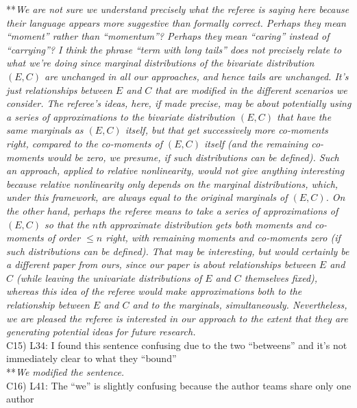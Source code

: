 \documentclass[letterpaper,11pt]{article}
\begin{document}
\noindent ***\emph{We are not sure we understand precisely what the referee is saying here because their language
appears more suggestive than formally correct. Perhaps they mean
``moment'' rather than ``momentum''? Perhaps they mean ``caring'' instead of ``carrying''? I think the phrase 
``term with long tails'' does not precisely relate to what we're doing since marginal distributions
of the bivariate distribution $(E,C)$ are unchanged in all our approaches, and hence tails are unchanged. 
It's just relationships
between $E$ and $C$ that are modified in the different scenarios we consider. The referee's ideas, here,
if made precise, may be about potentially using a series of approximations to the bivariate distribution $(E,C)$
that have the same marginals as $(E,C)$ itself, but that get successively more co-moments right, compared to the
co-moments of $(E,C)$ itself (and the 
remaining co-moments would be zero, we presume, if
such distributions can be defined). Such an approach, applied to relative nonlinearity, would not give
anything interesting because relative nonlinearity only depends on the marginal distributions, which, 
under this framework, are always equal to the original marginals of $(E,C)$. On the other hand,
perhaps the referee means to take a series of approximations of $(E,C)$ so that the $n$th 
approximate distribution gets both moments and co-moments of order $\leq n$ right, with remaining
moments and co-moments zero (if such distributions can be defined). That may be interesting, but would
certainly be a different paper from ours, since our paper is about \emph{relationships} between $E$ and $C$
(while leaving the univariate distributions of $E$ and $C$ themselves fixed), whereas this idea of the 
referee would make approximations
both to the relationship between $E$ and $C$ and to the marginals, simultaneously. Nevertheless, 
we are pleased the referee 
is interested in our approach to the extent that they are generating potential ideas for future research.} \\

\noindent C15) L34: I found this sentence confusing due to the two “betweens” and it’s not immediately clear to what they “bound” \\

\noindent ***\emph{We modified the sentence.} \\

\noindent C16) L41: The “we” is slightly confusing because the author teams share only one author \\
\end{document}

